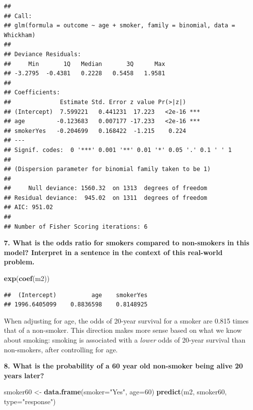 \documentclass[]{article}
\newenvironment{Shaded}{\begin{snugshade}}{\end{snugshade}}
\newcommand{\DataTypeTok}[1]{\textcolor[rgb]{0.13,0.29,0.53}{#1}}
\newcommand{\DecValTok}[1]{\textcolor[rgb]{0.00,0.00,0.81}{#1}}
\newcommand{\KeywordTok}[1]{\textcolor[rgb]{0.13,0.29,0.53}{\textbf{#1}}}
\newcommand{\NormalTok}[1]{#1}
\newcommand{\StringTok}[1]{\textcolor[rgb]{0.31,0.60,0.02}{#1}}
\begin{document}
\begin{verbatim}
## 
## Call:
## glm(formula = outcome ~ age + smoker, family = binomial, data = Whickham)
## 
## Deviance Residuals: 
##     Min       1Q   Median       3Q      Max  
## -3.2795  -0.4381   0.2228   0.5458   1.9581  
## 
## Coefficients:
##              Estimate Std. Error z value Pr(>|z|)    
## (Intercept)  7.599221   0.441231  17.223   <2e-16 ***
## age         -0.123683   0.007177 -17.233   <2e-16 ***
## smokerYes   -0.204699   0.168422  -1.215    0.224    
## ---
## Signif. codes:  0 '***' 0.001 '**' 0.01 '*' 0.05 '.' 0.1 ' ' 1
## 
## (Dispersion parameter for binomial family taken to be 1)
## 
##     Null deviance: 1560.32  on 1313  degrees of freedom
## Residual deviance:  945.02  on 1311  degrees of freedom
## AIC: 951.02
## 
## Number of Fisher Scoring iterations: 6
\end{verbatim}

\vspace{0.25in}

\textbf{7. What is the odds ratio for smokers compared to non-smokers in
this model? Interpret in a sentence in the context of this real-world
problem.}

\begin{Shaded}
\begin{Highlighting}[]
\KeywordTok{exp}\NormalTok{(}\KeywordTok{coef}\NormalTok{(m2))}
\end{Highlighting}
\end{Shaded}

\begin{verbatim}
##  (Intercept)          age    smokerYes 
## 1996.6405099    0.8836598    0.8148925
\end{verbatim}

When adjusting for age, the odds of 20-year survival for a smoker are
0.815 times that of a non-smoker. This direction makes more sense based
on what we know about smoking: smoking is associated with a \emph{lower}
odds of 20-year survival than non-smokers, after controlling for age.

\vspace{0.25in}

\textbf{8. What is the probability of a 60 year old non-smoker being
alive 20 years later?}

\begin{Shaded}
\begin{Highlighting}[]
\NormalTok{smoker60 <-}\StringTok{ }\KeywordTok{data.frame}\NormalTok{(}\DataTypeTok{smoker=}\StringTok{"Yes"}\NormalTok{, }\DataTypeTok{age=}\DecValTok{60}\NormalTok{)}
\KeywordTok{predict}\NormalTok{(m2, smoker60, }\DataTypeTok{type=}\StringTok{"response"}\NormalTok{)}
\end{Highlighting}
\end{Shaded}
\end{document}
